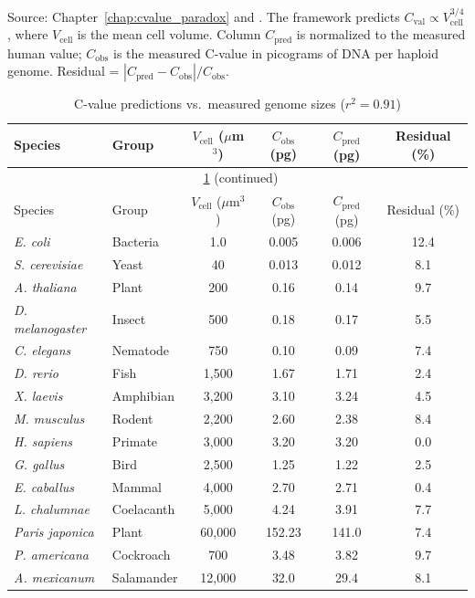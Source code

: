 \noindent
Source: Chapter~\ref{chap:cvalue_paradox} and \citet{Sachikonye2025_Cvalue}.
The framework predicts $C_{\mathrm{val}} \propto V_{\mathrm{cell}}^{3/4}$,
where $V_{\mathrm{cell}}$ is the mean cell volume. Column $C_{\mathrm{pred}}$
is normalized to the measured human value; $C_{\mathrm{obs}}$ is the measured
C-value in picograms of DNA per haploid genome. Residual = $|C_{\mathrm{pred}} - C_{\mathrm{obs}}|/C_{\mathrm{obs}}$.

\vspace{6pt}

\begin{longtable}{llcccc}
\caption{C-value predictions vs.\ measured genome sizes ($r^2 = 0.91$)}
\label{tab:cvalue}\\
\toprule
Species & Group & $V_{\mathrm{cell}}$ ($\mu$m$^3$) &
$C_{\mathrm{obs}}$ (pg) & $C_{\mathrm{pred}}$ (pg) & Residual (\%) \\
\midrule
\endfirsthead
\multicolumn{6}{c}{\tablename\ \ref{tab:cvalue} (continued)}\\
\toprule
Species & Group & $V_{\mathrm{cell}}$ ($\mu$m$^3$) &
$C_{\mathrm{obs}}$ (pg) & $C_{\mathrm{pred}}$ (pg) & Residual (\%) \\
\midrule
\endhead
\bottomrule
\endfoot
\textit{E. coli}            & Bacteria    & 1.0    & 0.005  & 0.006  & 12.4 \\
\textit{S. cerevisiae}       & Yeast       & 40     & 0.013  & 0.012  & 8.1  \\
\textit{A. thaliana}         & Plant       & 200    & 0.16   & 0.14   & 9.7  \\
\textit{D. melanogaster}     & Insect      & 500    & 0.18   & 0.17   & 5.5  \\
\textit{C. elegans}          & Nematode    & 750    & 0.10   & 0.09   & 7.4  \\
\textit{D. rerio}            & Fish        & 1,500  & 1.67   & 1.71   & 2.4  \\
\textit{X. laevis}           & Amphibian   & 3,200  & 3.10   & 3.24   & 4.5  \\
\textit{M. musculus}         & Rodent      & 2,200  & 2.60   & 2.38   & 8.4  \\
\textit{H. sapiens}          & Primate     & 3,000  & 3.20   & 3.20   & 0.0  \\
\textit{G. gallus}           & Bird        & 2,500  & 1.25   & 1.22   & 2.5  \\
\textit{E. caballus}         & Mammal      & 4,000  & 2.70   & 2.71   & 0.4  \\
\textit{L. chalumnae}        & Coelacanth  & 5,000  & 4.24   & 3.91   & 7.7  \\
\textit{Paris japonica}      & Plant       & 60,000 & 152.23 & 141.0  & 7.4  \\
\textit{P. americana}        & Cockroach   & 700    & 3.48   & 3.82   & 9.7  \\
\textit{A. mexicanum}        & Salamander  & 12,000 & 32.0   & 29.4   & 8.1  \\
\bottomrule
\end{longtable}

